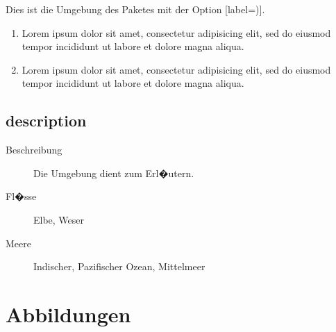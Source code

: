 Dies ist die  Umgebung des Paketes  mit der Option [label=)].

\begin{enumerate}[label=\alph{enumi})]
         \item Lorem ipsum dolor sit amet, consectetur adipisicing elit, sed do eiusmod tempor incididunt ut labore et dolore magna aliqua.
         \item Lorem ipsum dolor sit amet, consectetur adipisicing elit, sed do eiusmod tempor incididunt ut labore et dolore magna aliqua.
\end{enumerate}

\subsection{description}
%
\begin{description}
\item[Beschreibung] Die Umgebung  dient zum Erl�utern.
\item[Fl�sse] Elbe, Weser
\item[Meere] Indischer, Pazifischer Ozean, Mittelmeer
\end{description}

\section{Abbildungen}

